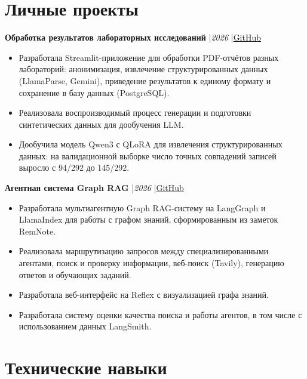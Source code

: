 \documentclass[12pt]{article}
\begin{document}
\newpage

\section*{Личные проекты}
\vspace{3pt}

\textbf{Обработка результатов лабораторных исследований}
\enspace|\enspace\textit{2026}
\enspace|\enspace\href{https://github.com/KseniaGu/healthcare-assistant}
    {\textcolor{blue!65!black}{GitHub}}
\begin{itemize}
    \item Разработала Streamlit-приложение для обработки PDF-отчётов разных лабораторий: анонимизация, извлечение структурированных данных (LlamaParse, Gemini), приведение результатов к единому формату и сохранение в базу данных (PostgreSQL).
    \item Реализовала воспроизводимый процесс генерации и подготовки синтетических данных для дообучения LLM.
    \item Дообучила модель Qwen3 с QLoRA для извлечения структурированных данных: на валидационной выборке число точных совпадений записей выросло с 94/292 до 145/292. 
\end{itemize}

\vspace{3pt}
\textbf{Агентная система Graph RAG}
\enspace|\enspace\textit{2026}
\enspace|\enspace\href{https://github.com/KseniaGu/remnote-graph-rag}
    {\textcolor{blue!65!black}{GitHub}}
\begin{itemize}
  \item Разработала мультиагентную Graph RAG-систему на LangGraph и LlamaIndex для работы с графом знаний, сформированным из заметок RemNote.
  \item Реализовала маршрутизацию запросов между специализированными агентами, поиск и проверку информации, веб-поиск (Tavily), генерацию ответов и обучающих заданий.
  \item Разработала веб-интерфейс на Reflex с визуализацией графа знаний.
  \item Разработала систему оценки качества поиска и работы агентов, в том числе с использованием данных LangSmith.
\end{itemize}
\vspace{2pt}

\section*{Технические навыки}
\vspace{3pt}
\end{document}
